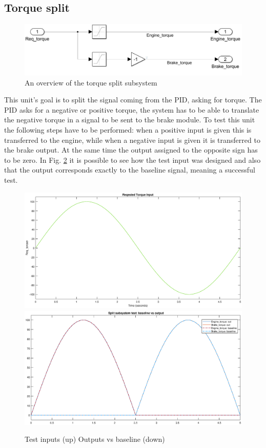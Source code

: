 \documentclass[12pt,a4paper]{report}
\begin{document}
\subsection{Torque split}
\begin{figure}[!h]
	\centering
	\includegraphics[scale=0.34]{split_subs.jpg}
	\caption{An overview of the torque split subsystem}
	\label{split_subs}
\end{figure}
This unit’s goal is to split the signal coming from the PID, asking for torque. The PID asks for a negative or positive torque, the system has to be able to translate the negative torque in a signal to be sent to the brake module. To test this unit the following steps have to be performed: when a positive input is given this is transferred to the engine, while when a negative input is given it is transferred to the brake output. At the same time the output assigned to the opposite sign has to be zero.
In Fig. \ref{input_split_test} it is possible to see how the test input was designed and also that the output corresponds exactly to the baseline signal, meaning a successful test.
\begin{figure}[!hbt]
	\centering
	\includegraphics[scale=0.4]{input_split_test}\hfill
	\includegraphics[scale=0.4]{out_split_test}
	\caption{Test inputs (up) Outputs vs baseline (down)}
	\label{input_split_test}
\end{figure}
\FloatBarrier
\end{document}
